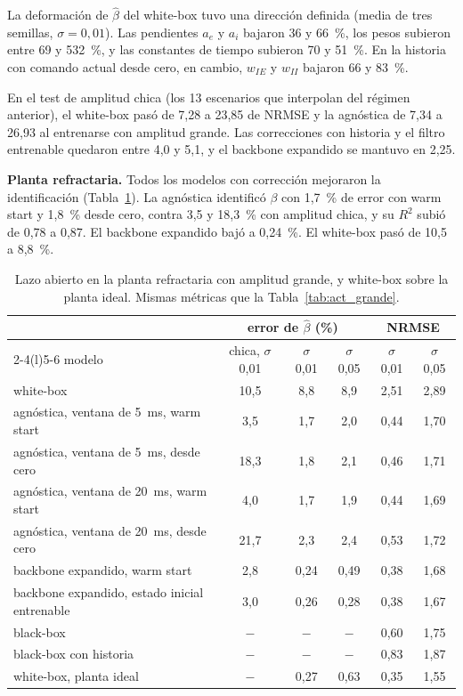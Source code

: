 \documentclass[11pt,a4paper]{article}
\newcommand{\bh}{\hat\beta}
\begin{document}
La deformación de $\bh$ del white-box tuvo una dirección definida (media de tres semillas, $\sigma = 0{,}01$). Las pendientes $a_e$ y $a_i$ bajaron 36 y 66~\%, los pesos subieron entre 69 y 532~\%, y las constantes de tiempo subieron 70 y 51~\%. En la historia con comando actual desde cero, en cambio, $w_{IE}$ y $w_{II}$ bajaron 66 y 83~\%.

En el test de amplitud chica (los 13 escenarios que interpolan del régimen anterior), el white-box pasó de 7,28 a 23,85 de NRMSE y la agnóstica de 7,34 a 26,93 al entrenarse con amplitud grande. Las correcciones con historia y el filtro entrenable quedaron entre 4,0 y 5,1, y el backbone expandido se mantuvo en 2,25.

\textbf{Planta refractaria.} Todos los modelos con corrección mejoraron la identificación (Tabla~\ref{tab:refrac_grande}). La agnóstica identificó $\beta$ con 1,7~\% de error con warm start y 1,8~\% desde cero, contra 3,5 y 18,3~\% con amplitud chica, y su $R^2$ subió de 0,78 a 0,87. El backbone expandido bajó a 0,24~\%. El white-box pasó de 10,5 a 8,8~\%.

\begin{table}[H]
\centering
\small
\caption{Lazo abierto en la planta refractaria con amplitud grande, y white-box sobre la planta ideal. Mismas métricas que la Tabla~\ref{tab:act_grande}.}
\label{tab:refrac_grande}
\begin{tabular}{@{}lccccc@{}}
\toprule
& \multicolumn{3}{c}{error de $\bh$ (\%)} & \multicolumn{2}{c}{NRMSE} \\
\cmidrule(lr){2-4}\cmidrule(l){5-6}
modelo & chica, $\sigma$ 0,01 & $\sigma$ 0,01 & $\sigma$ 0,05 & $\sigma$ 0,01 & $\sigma$ 0,05 \\
\midrule
white-box & 10,5 & 8,8 & 8,9 & 2,51 & 2,89 \\
agnóstica, ventana de 5~ms, warm start & 3,5 & 1,7 & 2,0 & 0,44 & 1,70 \\
agnóstica, ventana de 5~ms, desde cero & 18,3 & 1,8 & 2,1 & 0,46 & 1,71 \\
agnóstica, ventana de 20~ms, warm start & 4,0 & 1,7 & 1,9 & 0,44 & 1,69 \\
agnóstica, ventana de 20~ms, desde cero & 21,7 & 2,3 & 2,4 & 0,53 & 1,72 \\
backbone expandido, warm start & 2,8 & 0,24 & 0,49 & 0,38 & 1,68 \\
backbone expandido, estado inicial entrenable & 3,0 & 0,26 & 0,28 & 0,38 & 1,67 \\
black-box & $-$ & $-$ & $-$ & 0,60 & 1,75 \\
black-box con historia & $-$ & $-$ & $-$ & 0,83 & 1,87 \\
\midrule
white-box, planta ideal & $-$ & 0,27 & 0,63 & 0,35 & 1,55 \\
\bottomrule
\end{tabular}
\end{table}
\end{document}
